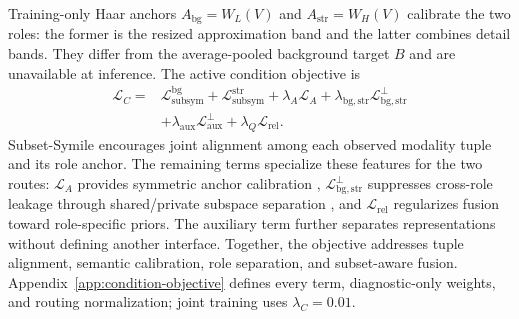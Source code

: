 \documentclass[letterpaper]{article}
\begin{document}
Training-only Haar anchors $A_{\mathrm{bg}}=W_L(V)$ and $A_{\mathrm{str}}=W_H(V)$ \cite{mallat1989theory} calibrate the two roles: the former is the resized approximation band and the latter combines detail bands. They differ from the average-pooled background target $B$ and are unavailable at inference. The active condition objective is
\begin{align}
\mathcal L_C
={}&\mathcal L_{\mathrm{subsym}}^{\mathrm{bg}}
 +\mathcal L_{\mathrm{subsym}}^{\mathrm{str}}+\lambda_A\mathcal L_A
 +\lambda_{\mathrm{bg,str}}\mathcal L_{\mathrm{bg,str}}^{\perp}
\nonumber\\
&+\lambda_{\mathrm{aux}}\mathcal L_{\mathrm{aux}}^{\perp}
 +\lambda_Q\mathcal L_{\mathrm{rel}}.
\label{eq:condition-loss}
\end{align}
Subset-Symile \cite{saporta2024symile} encourages joint alignment among each observed modality tuple and its role anchor. The remaining terms specialize these features for the two routes: $\mathcal L_A$ provides symmetric anchor calibration \cite{chen2020simclr}, $\mathcal L_{\mathrm{bg,str}}^{\perp}$ suppresses cross-role leakage through shared/private subspace separation \cite{bousmalis2016domain}, and $\mathcal L_{\mathrm{rel}}$ regularizes fusion toward role-specific priors. The auxiliary term further separates representations without defining another interface. Together, the objective addresses tuple alignment, semantic calibration, role separation, and subset-aware fusion. Appendix~\ref{app:condition-objective} defines every term, diagnostic-only weights, and routing normalization; joint training uses $\lambda_C=0.01$.
\end{document}
